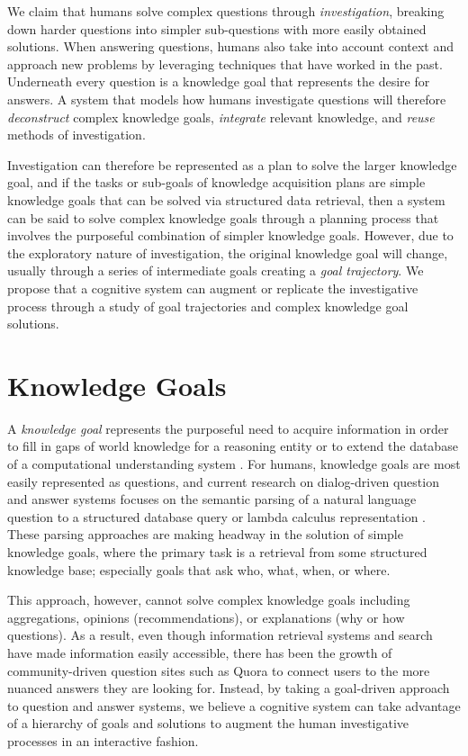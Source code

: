 \documentclass[letterpaper]{article}
\begin{document}
We claim that humans solve complex questions through \textit{investigation}, breaking down harder questions into simpler sub-questions with more easily obtained solutions. When answering questions, humans also take into account context and approach new problems by leveraging techniques that have worked in the past. Underneath every question is a knowledge goal that represents the desire for answers. A system that models how humans investigate questions will therefore \textit{deconstruct} complex knowledge goals, \textit{integrate} relevant knowledge, and \textit{reuse} methods of investigation.

Investigation can therefore be represented as a plan to solve the larger knowledge goal, and if the tasks or sub-goals of knowledge acquisition plans are simple knowledge goals that can be solved via structured data retrieval, then a system can be said to solve complex knowledge goals through a planning process that involves the purposeful combination of simpler knowledge goals. However, due to the exploratory nature of investigation, the original knowledge goal will change, usually through a series of intermediate goals creating a \textit{goal trajectory}. We propose that a cognitive system can augment or replicate the investigative process through a study of goal trajectories and complex knowledge goal solutions.


\section{Knowledge Goals}

A \textit{knowledge goal} represents the purposeful need to acquire information in order to fill in gaps of world knowledge for a reasoning entity or to extend the database of a computational understanding system \cite{ram_goal-based_1991}. For humans, knowledge goals are most easily represented as questions, and current research on dialog-driven question and answer systems focuses on the semantic parsing of a natural language question to a structured database query \cite{yahya_natural_2012} or lambda calculus representation \cite{berant_semantic_2013}. These parsing approaches are making headway in the solution of simple knowledge goals, where the primary task is a retrieval from some structured knowledge base; especially goals that ask who, what, when, or where.

This approach, however, cannot solve complex knowledge goals including aggregations, opinions (recommendations), or explanations (why or how questions). As a result, even though information retrieval systems and search have made information easily accessible, there has been the growth of community-driven question sites such as Quora \cite{wang_wisdom_2013} to connect users to the more nuanced answers they are looking for. Instead, by taking a goal-driven approach to question and answer systems, we believe a cognitive system can take advantage of a hierarchy of goals and solutions to augment the human investigative processes in an interactive fashion.
\end{document}
